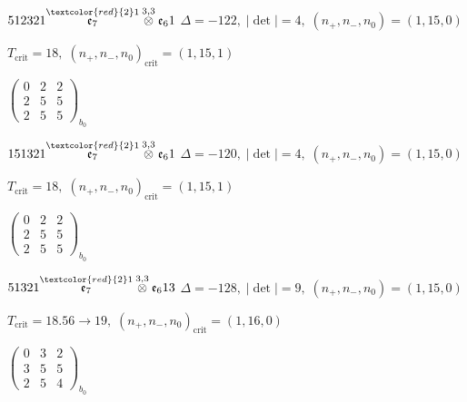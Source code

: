 \documentclass[10pt]{article}
\begin{document}
\smallskip

$512321\overset{\textcolor{red}{2}1}{\mathfrak{e}_7}\overset{3,3}{\otimes}\mathfrak{e}_61$ \quad $\Delta=-122,\; |\det|=4,\; (n_+,n_-,n_0)=(1,15,0)$

\hspace{1em}$T_{\text{crit}}=18,\; (n_+,n_-,n_0)_{\text{crit}}=(1,15,1)$

\hspace{2em}$\left(\begin{smallmatrix}0 & 2 & 2 \\ 2 & 5 & 5 \\ 2 & 5 & 5\end{smallmatrix}\right)_{\!b_0}$

\smallskip

$151321\overset{\textcolor{red}{2}1}{\mathfrak{e}_7}\overset{3,3}{\otimes}\mathfrak{e}_61$ \quad $\Delta=-120,\; |\det|=4,\; (n_+,n_-,n_0)=(1,15,0)$

\hspace{1em}$T_{\text{crit}}=18,\; (n_+,n_-,n_0)_{\text{crit}}=(1,15,1)$

\hspace{2em}$\left(\begin{smallmatrix}0 & 2 & 2 \\ 2 & 5 & 5 \\ 2 & 5 & 5\end{smallmatrix}\right)_{\!b_0}$

\smallskip

$51321\overset{\textcolor{red}{2}1}{\mathfrak{e}_7}\overset{3,3}{\otimes}\mathfrak{e}_613$ \quad $\Delta=-128,\; |\det|=9,\; (n_+,n_-,n_0)=(1,15,0)$

\hspace{1em}$T_{\text{crit}}=18.56 \to 19,\; (n_+,n_-,n_0)_{\text{crit}}=(1,16,0)$

\hspace{2em}$\left(\begin{smallmatrix}0 & 3 & 2 \\ 3 & 5 & 5 \\ 2 & 5 & 4\end{smallmatrix}\right)_{\!b_0}$

\smallskip
\end{document}
